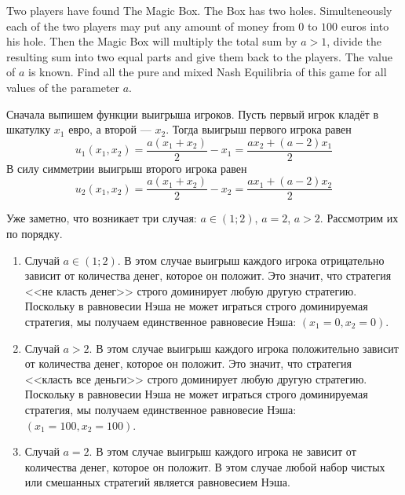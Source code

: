 \begin{problem}
Two players have found The Magic Box. The Box has two holes. Simulteneously each of the two players may put any amount of money from $0$ to $100$ euros into his hole. Then the Magic Box will multiply the total sum by $a>1$, divide the resulting sum into two equal parts and give them back to the players. The value of $a$ is known. Find all the pure and mixed Nash Equilibria of this game for all values of the parameter $a$.


\begin{sol}
Сначала выпишем функции выигрыша игроков. Пусть первый игрок кладёт в шкатулку $x_1$ евро, а второй --- $x_2$. Тогда выигрыш первого игрока равен
\[
u_1(x_1,x_2)=\frac{a(x_1+x_2)}{2} - x_1=\frac{ax_2+(a-2)x_1}{2}
\]
В силу симметрии выигрыш второго игрока равен
\[
u_2(x_1,x_2)=\frac{a(x_1+x_2)}{2} - x_2=\frac{ax_1+(a-2)x_2}{2}
\]

Уже заметно, что возникает три случая: $a \in (1;2)$, $a=2$, $a>2$. Рассмотрим их по порядку.
\begin{enumerate}
\item Случай $a\in(1;2)$. В этом случае выигрыш каждого игрока отрицательно зависит от количества денег, которое он положит. Это значит, что стратегия <<не класть денег>> строго доминирует любую другую стратегию. Поскольку в равновесии Нэша не может играться строго доминируемая стратегия, мы получаем единственное равновесие Нэша: $(x_1=0, x_2=0)$.

\item Случай $a>2$. В этом случае выигрыш каждого игрока положительно зависит от количества денег, которое он положит. Это значит, что стратегия <<класть все деньги>> строго доминирует любую другую стратегию. Поскольку в равновесии Нэша не может играться строго доминируемая стратегия, мы получаем единственное равновесие Нэша: $(x_1=100, x_2=100)$.

\item Случай $a=2$. В этом случае выигрыш каждого игрока не зависит от количества денег, которое он положит. В этом случае любой набор чистых или смешанных стратегий является равновесием Нэша.

\end{enumerate}
\end{sol}
\end{problem}

